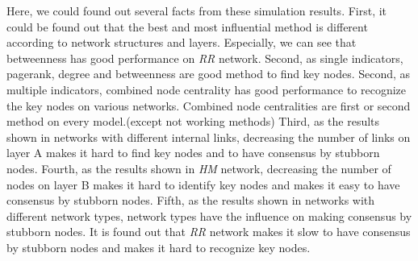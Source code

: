 Here, we could found out several facts from these simulation results. First, it could be found out that the best and most influential method is different according to network structures and layers. Especially, we can see that betweenness has good performance on \textit{RR} network. Second, as single indicators, pagerank, degree and betweenness are good method to find key nodes. Second, as multiple indicators, combined node centrality has good performance to recognize the key nodes on various networks. Combined node centralities are first or second method on every model.(except not working methods)  Third, as the results shown in networks with different internal links, decreasing the number of links on layer A makes it hard to find key nodes and to have consensus by stubborn nodes.  Fourth, as the results shown in \textit{HM} network, decreasing the number of nodes on layer B makes it hard to identify key nodes and makes it easy to have consensus by stubborn nodes. Fifth, as the results shown in networks with different network types, network types have the influence on making consensus by stubborn nodes. It is found out that \textit{RR} network makes it slow to have consensus by stubborn nodes and makes it hard to recognize key nodes. 




